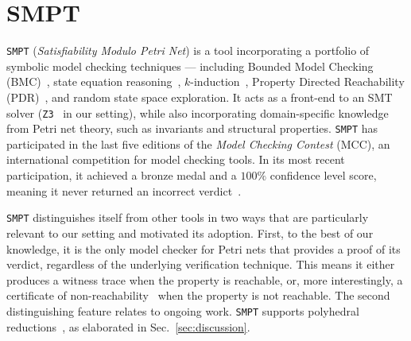 

\section{SMPT}
\label{appendix:smpt}



\texttt{SMPT} (\emph{Satisfiability Modulo Petri Net}) is a tool incorporating a portfolio of symbolic model checking techniques --- including Bounded Model Checking (BMC)~\cite{BiCiClZh99}, state equation reasoning~\cite{Mu77}, $k$-induction~\cite{ShSiSt20}, Property Directed Reachability (PDR)~\cite{Br11,AmDaHu22}, and random state space exploration. It acts as a front-end to an SMT solver (\texttt{Z3}~\cite{DeBj08} in our setting), while also incorporating domain-specific knowledge from Petri net theory, such as invariants and structural properties. \texttt{SMPT} has participated in the last five editions of the \textit{Model Checking Contest} (MCC), an international competition for model checking tools. In its most recent participation, it achieved a bronze medal and a $100\%$ confidence level score, meaning it never returned an incorrect verdict~\cite{mcc:2025}.

\texttt{SMPT} distinguishes itself from other tools in two ways that are particularly relevant to our setting and motivated its adoption. First, to the best of our knowledge, it is the only model checker for Petri nets that provides a proof of its verdict, regardless of the underlying verification technique. This means it either produces a witness trace when the property is reachable, or, more interestingly, a certificate of non-reachability~\cite{AmDaHu22} when the property is not reachable.
%
The second distinguishing feature relates to ongoing work. \texttt{SMPT} supports polyhedral reductions~\cite{AmBeDa21}, as elaborated in Sec.~\ref{sec:discussion}.



